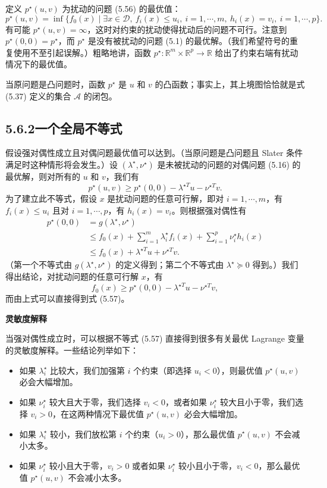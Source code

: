 \documentclass[UTF8,12pt,a4paper,fontset=fandol]{ctexart}
\begin{document}
定义 $p^\star(u,v)$ 为扰动的问题 (5.56) 的最优值：
\[
p^\star(u,v)=\inf\{f_0(x)\mid \exists x\in\mathcal{D},\ f_i(x)\leq u_i,\ i=1,\cdots,m,\ h_i(x)=v_i,\ i=1,\cdots,p\}.
\]
有可能 $p^\star(u,v)=\infty$，这时对约束的扰动使得扰动后的问题不可行。注意到 $p^\star(0,0)=p^\star$，而 $p^\star$ 是没有被扰动的问题 (5.1) 的最优解。（我们希望符号的重复使用不至引起误解。）粗略地讲，函数 $p^\star:\mathbb{R}^m\times\mathbb{R}^p\to\mathbb{R}$ 给出了约束右端有扰动情况下的最优值。

当原问题是凸问题时，函数 $p^\star$ 是 $u$ 和 $v$ 的凸函数；事实上，其上境图恰恰就是式 (5.37) 定义的集合 $\mathcal{A}$ 的闭包。

\subsection*{5.6.2\quad 一个全局不等式}

假设强对偶性成立且对偶问题最优值可以达到。（当原问题是凸问题且 Slater 条件满足时这种情形将会发生。）设 $(\lambda^\star,\nu^\star)$ 是未被扰动的问题的对偶问题 (5.16) 的最优解，则对所有的 $u$ 和 $v$，我们有
\begin{equation}
p^\star(u,v)\geq p^\star(0,0)-\lambda^{\star T}u-\nu^{\star T}v.
\tag{5.57}
\end{equation}
为了建立此不等式，假设 $x$ 是扰动问题的任意可行解，即对 $i=1,\cdots,m$，有 $f_i(x)\leq u_i$ 且对 $i=1,\cdots,p$，有 $h_i(x)=v_i$。则根据强对偶性有
\[
\begin{aligned}
p^\star(0,0)
&=g(\lambda^\star,\nu^\star)\\
&\leq f_0(x)+\sum_{i=1}^m\lambda_i^\star f_i(x)+\sum_{i=1}^p\nu_i^\star h_i(x)\\
&\leq f_0(x)+\lambda^{\star T}u+\nu^{\star T}v.
\end{aligned}
\]
（第一个不等式由 $g(\lambda^\star,\nu^\star)$ 的定义得到；第二个不等式由 $\lambda^\star\succeq 0$ 得到。）我们得出结论，对扰动问题的任意可行解 $x$，有
\[
f_0(x)\geq p^\star(0,0)-\lambda^{\star T}u-\nu^{\star T}v,
\]
而由上式可以直接得到式 (5.57)。

\noindent\textbf{灵敏度解释}

当强对偶性成立时，可以根据不等式 (5.57) 直接得到很多有关最优 Lagrange 变量的灵敏度解释。一些结论列举如下：
\begin{itemize}
\item 如果 $\lambda_i^\star$ 比较大，我们加强第 $i$ 个约束（即选择 $u_i<0$），则最优值 $p^\star(u,v)$ 必会大幅增加。
\item 如果 $\nu_i^\star$ 较大且大于零，我们选择 $v_i<0$，或者如果 $\nu_i^\star$ 较大且小于零，我们选择 $v_i>0$，在这两种情况下最优值 $p^\star(u,v)$ 必会大幅增加。
\item 如果 $\lambda_i^\star$ 较小，我们放松第 $i$ 个约束（$u_i>0$），那么最优值 $p^\star(u,v)$ 不会减小太多。
\item 如果 $\nu_i^\star$ 较小且大于零，$v_i>0$ 或者如果 $\nu_i^\star$ 较小且小于零，$v_i<0$，那么最优值 $p^\star(u,v)$ 不会减小太多。
\end{itemize}
\end{document}

